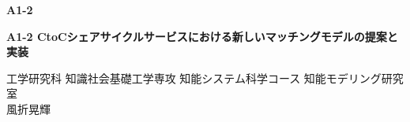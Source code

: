 \begin{flushright}
    \textbf{\large A1-2}
\end{flushright}
\begin{center}
    \textbf{\large {A1-2 CtoCシェアサイクルサービスにおける新しいマッチングモデルの提案と実装}}
\end{center}
\begin{center}
工学研究科 知識社会基礎工学専攻 知能システム科学コース 知能モデリング研究室\\
風折晃輝
\end{center}
